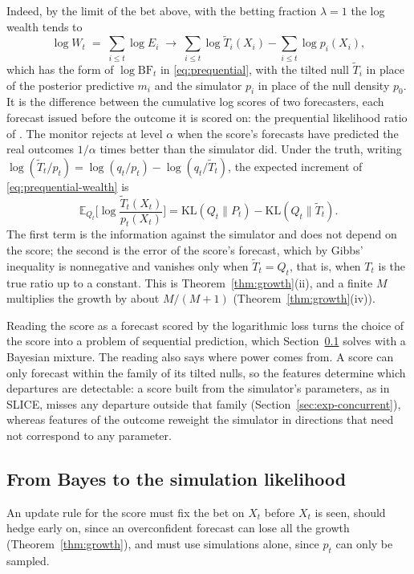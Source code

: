 \documentclass[12pt]{article}
\newcommand{\E}{\mathbb{E}}
\newcommand{\KL}{\mathrm{KL}}
\theoremstyle{remark}
\begin{document}
Indeed, by the limit of the bet above, with the betting fraction
$\lambda = 1$ the log wealth tends to
\begin{equation}\label{eq:prequential-wealth}
\log W_t \;=\; \sum_{i \le t} \log E_i \;\to\; \sum_{i \le t} \log \tilde T_i(X_i)
- \sum_{i \le t} \log p_i(X_i),
\end{equation}
which has the form of $\log \mathrm{BF}_t$ in \eqref{eq:prequential}, with
the tilted null $\tilde T_i$ in place of the posterior predictive $m_i$ and
the simulator $p_i$ in place of the null density $p_0$. It is the difference
between the cumulative log scores of two forecasters, each forecast issued
before the outcome it is scored on: the prequential likelihood ratio of
\citet{dawid1984present}. The monitor rejects at level $\alpha$ when the
score's forecasts have predicted the real outcomes $1/\alpha$ times better
than the simulator did. Under the truth, writing
$\log(\tilde T_t/p_t) = \log(q_t/p_t) - \log(q_t/\tilde T_t)$, the expected
increment of \eqref{eq:prequential-wealth} is
\[
\E_{Q_t}\Big[\log\frac{\tilde T_t(X_t)}{p_t(X_t)}\Big]
= \KL(Q_t\|P_t) - \KL(Q_t\|\tilde T_t).
\]
The first term is the information against the simulator and does not depend
on the score; the second is the error of the score's forecast, which by
Gibbs' inequality is nonnegative and vanishes only when $\tilde T_t = Q_t$,
that is, when $T_t$ is the true ratio up to a constant. This is
Theorem~\ref{thm:growth}(ii), and a finite $M$ multiplies the growth by about
$M/(M+1)$ (Theorem~\ref{thm:growth}(iv)). 

Reading the score as a forecast scored by the logarithmic loss turns the
choice of the score into a problem of sequential prediction, which
Section~\ref{sec:rules} solves with a Bayesian mixture. The reading also says
where power comes from. A score can only forecast within the family of its tilted nulls, so the features determine which departures are detectable: a score built from the simulator's parameters, as in SLICE, misses any departure outside that family (Section~\ref{sec:exp-concurrent}), whereas features of the outcome reweight the simulator in directions that need not correspond to any parameter. 

\subsection{From Bayes to the simulation likelihood}\label{sec:rules}\label{sec:exactbayes}\label{sec:simlik}

An update rule for the score must fix the bet on
$X_t$ before $X_t$ is seen, should hedge early on, since an overconfident
forecast can lose all the growth (Theorem~\ref{thm:growth}), and must use
simulations alone, since $p_t$ can only be sampled.
\end{document}

